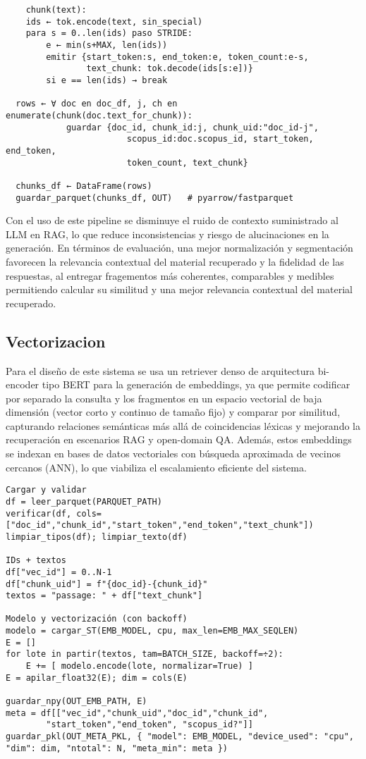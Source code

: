 \begin{enumerate}
\begin{verbatim}
    chunk(text):
    ids ← tok.encode(text, sin_special)
    para s = 0..len(ids) paso STRIDE:
        e ← min(s+MAX, len(ids))
        emitir {start_token:s, end_token:e, token_count:e-s,
                text_chunk: tok.decode(ids[s:e])}
        si e == len(ids) → break

  rows ← ∀ doc en doc_df, j, ch en enumerate(chunk(doc.text_for_chunk)):
            guardar {doc_id, chunk_id:j, chunk_uid:"doc_id-j",
                        scopus_id:doc.scopus_id, start_token, end_token,
                        token_count, text_chunk}

  chunks_df ← DataFrame(rows)
  guardar_parquet(chunks_df, OUT)   # pyarrow/fastparquet
\end{verbatim}


\end{enumerate}

Con el uso de este pipeline se disminuye el ruido de contexto suministrado al LLM en RAG, 
lo que reduce inconsistencias y riesgo de alucinaciones en la generación. En términos de evaluación, una mejor normalización y segmentación
 favorecen la relevancia contextual del material recuperado y la fidelidad de las respuestas, al entregar fragementos más coherentes, comparables y medibles permitiendo
 calcular su similitud y una mejor relevancia contextual del material recuperado.


\subsection{Vectorizacion}
Para el diseño de este sistema se usa un retriever denso de arquitectura bi-encoder tipo BERT para la generación de embeddings, ya que permite codificar por separado la 
consulta y los fragmentos en un espacio vectorial de baja dimensión (vector corto y continuo de tamaño fijo) y comparar por similitud, 
capturando relaciones semánticas más allá de coincidencias léxicas y mejorando la recuperación en escenarios RAG y open-domain QA.
Además, estos embeddings se indexan en bases de datos vectoriales con búsqueda aproximada de vecinos cercanos (ANN), lo que viabiliza el escalamiento eficiente del sistema\parencite{joshi2025vector}.
\begin{verbatim}
Cargar y validar
df = leer_parquet(PARQUET_PATH)
verificar(df, cols=["doc_id","chunk_id","start_token","end_token","text_chunk"])
limpiar_tipos(df); limpiar_texto(df)

IDs + textos
df["vec_id"] = 0..N-1
df["chunk_uid"] = f"{doc_id}-{chunk_id}"
textos = "passage: " + df["text_chunk"]

Modelo y vectorización (con backoff)
modelo = cargar_ST(EMB_MODEL, cpu, max_len=EMB_MAX_SEQLEN)
E = []
for lote in partir(textos, tam=BATCH_SIZE, backoff=÷2):
    E += [ modelo.encode(lote, normalizar=True) ]
E = apilar_float32(E); dim = cols(E)

guardar_npy(OUT_EMB_PATH, E)
meta = df[["vec_id","chunk_uid","doc_id","chunk_id",
        "start_token","end_token", "scopus_id?"]]
guardar_pkl(OUT_META_PKL, { "model": EMB_MODEL, "device_used": "cpu", "dim": dim, "ntotal": N, "meta_min": meta })
\end{verbatim}


